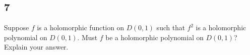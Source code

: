 \documentclass[12pt]{article}
\begin{document}
\newpage 
\subsection*{7}
\begin{tcolorbox}
Suppose $f$ is a holomorphic function on $D(0,1)$ such that $f^{2}$ is a holomorphic polynomial on $D(0,1)$. Must $f$ be a holomorphic polynomial on
$D(0,1)$? Explain your answer.
\end{tcolorbox}
\end{document}
